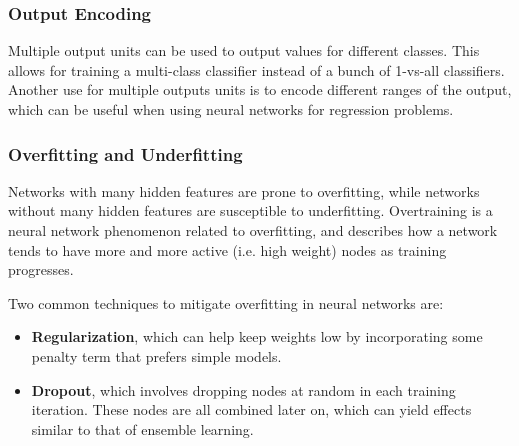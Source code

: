 \documentclass[12pt,titlepage]{article}
\begin{document}
      \subsubsection{Output Encoding}
        Multiple output units can be used to output values for different classes. This allows for training a multi-class classifier instead of a bunch of 1-vs-all classifiers.
        Another use for multiple outputs units is to encode different ranges of the output, which can be useful when using neural networks for regression problems.

      \subsubsection{Overfitting and Underfitting}
        Networks with many hidden features are prone to overfitting, while networks without many hidden features are susceptible to underfitting. Overtraining is a neural
        network phenomenon related to overfitting, and describes how a network tends to have more and more active (i.e. high weight) nodes as training progresses.

        Two common techniques to mitigate overfitting in neural networks are:
        \begin{itemize}
          \item \textbf{Regularization}, which can help keep weights low by incorporating some penalty term that prefers simple models.
          \item \textbf{Dropout}, which involves dropping nodes at random in each training iteration. These nodes are all combined later on, which can yield effects
            similar to that of ensemble learning.
        \end{itemize}
\end{document}
